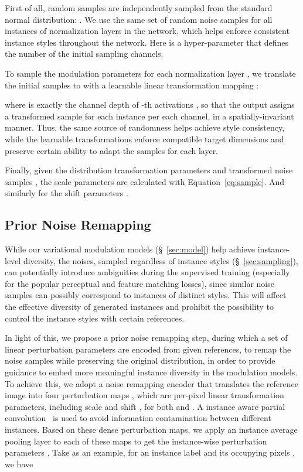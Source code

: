 \documentclass[final]{cvpr}
\begin{document}
First of all, random samples  are independently sampled from the standard normal distribution: . We use the same set of random noise samples  for all instances of normalization layers in the network, which helps enforce consistent instance styles throughout the network. Here  is a hyper-parameter that defines the number of the initial sampling channels.

To sample the modulation parameters for each normalization layer , we translate the initial samples  to  with a learnable linear transformation mapping :

where  is exactly the channel depth of -th activations , so that the output  assigns a transformed sample for each instance per each channel, in a spatially-invariant manner. Thus, the same source of randomness helps achieve style consistency, while the learnable transformations enforce compatible target dimensions and preserve certain ability to adapt the samples for each layer.

Finally, given the distribution transformation parameters  and transformed noise samples , the scale parameters  are calculated with Equation~\ref{eq:sample}. And similarly for the shift parameters .

\subsection{Prior Noise Remapping}
\label{sec:noise}
While our variational modulation models (\S~\ref{sec:model}) help achieve instance-level diversity, the noises, sampled regardless of instance styles (\S~\ref{sec:sampling}), can potentially introduce ambiguities during the supervised training (especially for the popular perceptual and feature matching losses), since similar noise samples can possibly correspond to instances of distinct styles. This will affect the effective diversity of generated instances and prohibit the possibility to control the instance styles with certain references.

In light of this, we propose a prior noise remapping step, during which a set of linear perturbation parameters are encoded from given references, to remap the noise samples while preserving the original distribution, in order to provide guidance to embed more meaningful instance diversity in the modulation models. To achieve this, we adopt a noise remapping encoder  that translates the reference image  into four perturbation maps , which are per-pixel linear transformation parameters, including scale  and shift , for both  and . A instance aware partial convolution~\cite{harley2017segmentation,liu2018image} is used to avoid information contamination between different instances.
Based on these dense perturbation maps, we apply an instance average pooling layer to each of these maps to get the instance-wise perturbation parameters . Take  as an example, for an instance label  and its occupying pixels , we have
\end{document}
